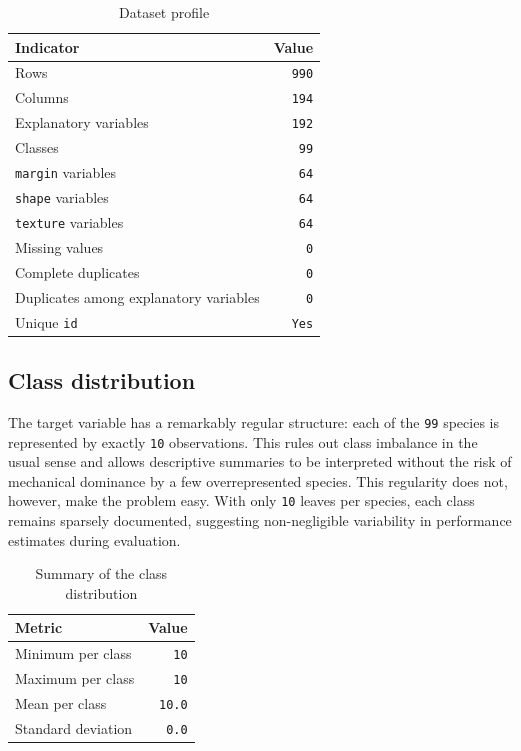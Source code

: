 \begin{table}[H]
\centering
\begin{tabular}{|l|r|}
\hline
\textbf{Indicator} & \textbf{Value} \\
\hline
Rows & \texttt{990} \\
Columns & \texttt{194} \\
Explanatory variables & \texttt{192} \\
Classes & \texttt{99} \\
\texttt{margin} variables & \texttt{64} \\
\texttt{shape} variables & \texttt{64} \\
\texttt{texture} variables & \texttt{64} \\
Missing values & \texttt{0} \\
Complete duplicates & \texttt{0} \\
Duplicates among explanatory variables & \texttt{0} \\
Unique \texttt{id} & \texttt{Yes} \\
\hline
\end{tabular}
\caption{Dataset profile}
\end{table}

\subsection{Class distribution}
The target variable has a remarkably regular structure: each of the \texttt{99} species is represented by exactly \texttt{10} observations. This rules out class imbalance in the usual sense and allows descriptive summaries to be interpreted without the risk of mechanical dominance by a few overrepresented species. This regularity does not, however, make the problem easy. With only \texttt{10} leaves per species, each class remains sparsely documented, suggesting non-negligible variability in performance estimates during evaluation.

\begin{table}[H]
\centering
\begin{tabular}{|l|r|}
\hline
\textbf{Metric} & \textbf{Value} \\
\hline
Minimum per class & \texttt{10} \\
Maximum per class & \texttt{10} \\
Mean per class & \texttt{10.0} \\
Standard deviation & \texttt{0.0} \\
\hline
\end{tabular}
\caption{Summary of the class distribution}
\end{table}

